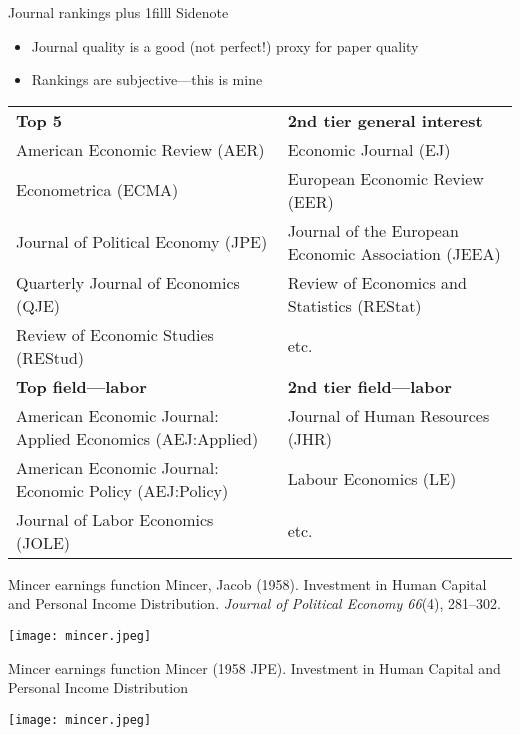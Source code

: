 \documentclass[aspectratio=169,compress,t,xcolor=table]{beamer}
\newcommand{\myhfill}[1]{\hskip0pt plus 1filll {\small #1}}
\begin{document}
{
\begin{frame}{Journal rankings \myhfill{Sidenote}}
  \begin{itemize}
    \vfill\item Journal quality is a good (not perfect!) proxy for paper quality
    \vfill\item Rankings are subjective---this is mine
  \end{itemize}

  \vfill{\scriptsize
  \begin{center}
    \begin{tabular}{ll}
      \textbf{Top 5} & \textbf{2nd tier general interest} \\
      American Economic Review (AER) & Economic Journal (EJ) \\
      Econometrica (ECMA) & European Economic Review (EER) \\
      Journal of Political Economy (JPE) & Journal of the European Economic Association (JEEA) \\
      Quarterly Journal of Economics (QJE) & Review of Economics and Statistics (REStat) \\
      Review of Economic Studies (REStud) & etc. \\[1em]
      \textbf{Top field---labor} & \textbf{2nd tier field---labor} \\
      American Economic Journal: Applied Economics (AEJ:Applied) & Journal of Human Resources (JHR) \\
      American Economic Journal: Economic Policy (AEJ:Policy) & Labour Economics (LE) \\
      Journal of Labor Economics (JOLE) & etc. \\
    \end{tabular}
  \end{center}
  }
\end{frame}
}

\begin{frame}{Mincer earnings function}
Mincer, Jacob (1958). Investment in Human Capital and Personal Income Distribution. \textit{Journal of Political Economy 66}(4), 281–302.
  \begin{center}
    \texttt{[image: mincer.jpeg]}
  \end{center}
\end{frame}
\addtocounter{framenumber}{-1}

\begin{frame}{Mincer earnings function}
Mincer (1958 JPE). Investment in Human Capital and Personal Income Distribution \\ \phantom{you}
  \begin{center}
    \texttt{[image: mincer.jpeg]}
  \end{center}
\end{frame}
\addtocounter{framenumber}{-1}
\end{document}

